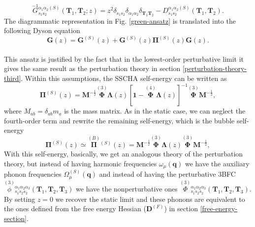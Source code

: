 \begin{equation}
 \overset{-1}{G}{}_{s_{1}s_{2}}^{\alpha_{1}\alpha_{2}(S)}(\mathbf{T}_{1},\mathbf{T}_{2};z)=z^{2}\delta_{s_{1}s_{2}}\delta_{\alpha_{1}\alpha_{2}}\delta_{\mathbf{T}_{1}\mathbf{T}_{2}}-D_{s_{1}s_{2}}^{\alpha_{1}\alpha_{2}(S)}(\mathbf{
 T}_{1},\mathbf{T}_{2}).
\end{equation}
The diagrammatic representation in Fig. \ref{green-ansatz} is translated into the following Dyson equation
\begin{equation}
 \mathbf{G}(z)=\mathbf{G}^{(S)}(z)+\mathbf{G}^{(S)}(z)\boldsymbol{\Pi}^{(S)}(z)\mathbf{G}(z).
\end{equation}
\\

This ansatz is justified by the fact that in the lowest-order perturbative limit it gives the same result 
as the perturbation theory in section \ref{perturbation-theory-third}. Within this assumptions, the SSCHA self-energy can be written as\cite{bianco2017second}
\begin{equation}
	\label{full-sscha-se}
	\boldsymbol{\Pi}^{(S)}(z)=\boldsymbol{M}^{-\frac{1}{2}}\overset{(3)}{\boldsymbol{\Phi}}\boldsymbol{\Lambda}(z)[\boldsymbol{1}-\overset{(4)}{\boldsymbol{\Phi}}\boldsymbol{\Lambda}(z)]^{-1}\overset{(3)}{\boldsymbol{\Phi}}\boldsymbol{M}^{-\frac{1}{2}},
\end{equation} 
where $M_{ab}=\delta_{ab}m_{a}$ is the mass matrix. As in the static case, we can neglect the fourth-order term and 
rewrite the remaining self-energy, which is the bubble self-energy
\begin{equation}
 \boldsymbol{\Pi}^{(S)}(z)\simeq\overset{(B)}{\boldsymbol{\Pi}}{}^{(S)}(z)=\boldsymbol{M}^{-\frac{1}{2}}\overset{(3)}{\boldsymbol{\Phi}}\boldsymbol{\Lambda}(z)\overset{(3)}{\boldsymbol{\Phi}}\boldsymbol{M}^{-\frac{1}{2}},
\end{equation}
With this self-energy, basically, we get an analogous theory of the perturbation theory, but instead of having harmonic frequencies $\omega_{\mu}(\mathbf{q})$ we 
have the auxiliary phonon frequencies $\Omega^{(S)}_{\mu}(\mathbf{q})$ and instead of having the perturbative 3BFC $\overset{(3)}{\phi}{}_{s_{1}s_{2}s_{2}}^{\alpha_{1}\alpha_{2}\alpha_{3}}(\mathbf{T}_{1},\mathbf{
 T}_{2},\mathbf{T}_{3})$ we have the nonperturbative ones $\overset{(3)}{\Phi}{}_{s_{1}s_{2}s_{2}}^{\alpha_{1}\alpha_{2}\alpha_{3}}(\mathbf{T}_{1},\mathbf{T}_{2},\mathbf{T}_{3})$. By setting $z=0$ we recover the static limit and these 
 phonons are equivalent to the ones defined from the free energy Hessian ($\boldsymbol{D}^{(F)}$) in 
 section \ref{free-energy-section}. \\

